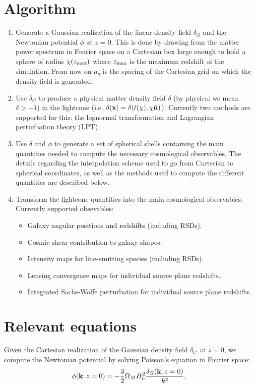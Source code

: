 \documentclass[a4paper,10pt]{article}
\newcommand{\nv}{\hat{\bf n}}
\begin{document}
\section{Algorithm}
  \begin{enumerate}
    \item Generate a Gaussian realization of the linear density field $\delta_G$ and
          the Newtonian potential $\phi$ at $z=0$. This is done by drawing from the
          matter power spectrum in Fourier space on a Cartesian box large enough to
          hold a sphere of radius $\chi(z_{\rm max})$ where $z_{\rm max}$ is the
          maximum redshift of the simulation. From now on $a_g$ is the spacing of
          the Cartesian grid on which the density field is generated.
    \item Use $\delta_G$ to produce a physical matter density field $\delta$ (by
          physical we mean $\delta>-1$) in the lightcone (i.e.
          $\delta({\bf x})=\delta(t(\chi),\chi\nv)$). Currently two methods are
	  supported for this: the lognormal transformation and Lagrangian perturbation
	  theory (LPT).
    \item Use $\delta$ and $\phi$ to generate a set of spherical shells containing the
          main quantities needed to compute the necessary cosmological observables.
          The details regarding the interpolation scheme used to go from Cartesian to
          spherical coordinates, as well as the methods used to compute the different
          quantities are described below.
    \item Transform the lightcone quantities into the main cosmological observables.
          Currently supported obsevables:
          \begin{itemize}
            \item Galaxy angular positions and redshifts (including RSDs).
            \item Cosmic shear contribution to galaxy shapes.
            \item Intensity maps for line-emitting species (including RSDs).
            \item Lensing convergence maps for individual source plane redshifts.
            \item Integrated Sachs-Wolfe perturbation for individual source plane
                  redshifts.
          \end{itemize}
  \end{enumerate}

\section{Relevant equations}
  Given the Cartesian realization of the Gaussian density field $\delta_G$ at $z=0$,
  we compute the Newtonian potential by solving Poisson's equation in Fourier space:
  \begin{equation}
    \phi({\bf k},z=0)=-\frac{3}{2}\Omega_MH_0^2\frac{\delta_G({\bf k},z=0)}{k^2},
  \end{equation}
\end{document}
